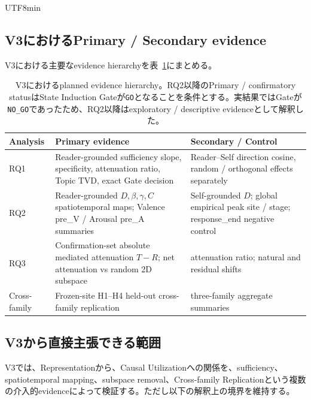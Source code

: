 \documentclass{article} %
\begin{document}
\begin{CJK*}{UTF8}{min}
\subsection{V3におけるPrimary / Secondary evidence}

V3における主要なevidence hierarchyを表~\ref{tab:v3-primary-secondary}にまとめる。

\begin{table}[htbp]
\centering
\small
\caption{
V3におけるplanned evidence hierarchy。RQ2以降のPrimary / confirmatory statusはState Induction Gateが\texttt{GO}となることを条件とする。実結果ではGateが\texttt{NO\_GO}であったため、RQ2以降はexploratory / descriptive evidenceとして解釈した。
}
\label{tab:v3-primary-secondary}
\begin{tabularx}{\linewidth}{
@{}
>{\raggedright\arraybackslash}p{2.1cm}
>{\raggedright\arraybackslash}p{4.1cm}
>{\raggedright\arraybackslash}X
@{}
}
\toprule
\textbf{Analysis} &
\textbf{Primary evidence} &
\textbf{Secondary / Control} \\
\midrule
RQ1 &
Reader-grounded sufficiency slope,
specificity,
attenuation ratio,
Topic TVD,
exact Gate decision &
Reader--Self direction cosine,
random / orthogonal effects separately \\

RQ2 &
Reader-grounded
\(D,\beta,\gamma,C\)
spatiotemporal maps;
Valence pre\_V / Arousal pre\_A summaries &
Self-grounded \(D\);
global empirical peak site / stage;
response\_end negative control \\

RQ3 &
Confirmation-set absolute
mediated attenuation \(T-R\);
net attenuation vs random 2D subspace &
attenuation ratio;
natural and residual shifts \\

Cross-family &
Frozen-site H1--H4
held-out cross-family replication &
three-family aggregate summaries \\
\bottomrule
\end{tabularx}
\end{table}


\subsection{V3から直接主張できる範囲}
\label{app:v3-interpretation}

V3では、Representationから、Causal Utilizationへの関係を、sufficiency、spatiotemporal mapping、subspace removal、Cross-family Replicationという複数の介入的evidenceによって検証する。ただし以下の解釈上の境界を維持する。


\end{CJK*}
\end{document}
